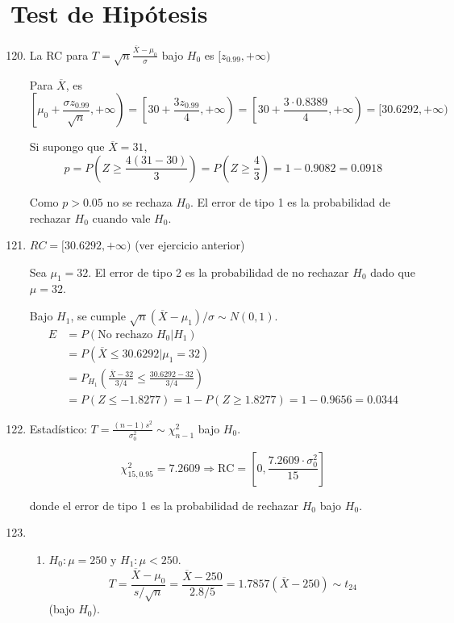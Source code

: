 \section{Test de Hipótesis}
\begin{enumerate}
	\setcounter{enumi}{119}
	\item
		La RC para $T = \sqrt{n}\frac{\overline{X}-\mu_0}{\sigma}$ bajo $H_0$ es $[z_{0.99},+\infty)$
		
		Para $\overline X$, es
		$$\left[\mu_0 + \frac{\sigma z_{0.99}}{\sqrt{n}}, +\infty\right) = \left[30 + \frac{3 z_{0.99}}{4}, +\infty\right) = \left[30 + \frac{3\cdot 0.8389}{4}, +\infty\right) = [30.6292, +\infty)$$
		
		Si supongo que $\overline{X} = 31$,
		$$p= P\left(Z \geq \frac{4(31-30)}{3}\right) = P\left(Z \geq \frac{4}{3}\right) = 1 - 0.9082 = 0.0918$$
		
		Como $p > 0.05$ no se rechaza $H_0$. El error de tipo 1 es la probabilidad de rechazar $H_0$ cuando vale $H_0$.
		
	\item
		$RC = [30.6292, +\infty)$ (ver ejercicio anterior)
		
		Sea $\mu_1 = 32$. El error de tipo 2 es la probabilidad de no rechazar $H_0$ dado que $\mu = 32$.
		
		Bajo $H_1$, se cumple $\sqrt{n}(\overline{X} - \mu_1) / \sigma \sim N(0,1)$.
		\begin{align*}
			E	& = P(\text{No rechazo }H_0|H_1)	\\
				& = P(\overline{X} \leq 30.6292| \mu_1 = 32)	\\
				& = P_{H_1}\left(\frac{\overline{X}-32}{3/4} \leq \frac{30.6292-32}{3/4}\right)	\\
				& = P(Z \leq -1.8277)	= 1 - P(Z \geq 1.8277) = 1 - 0.9656 = 0.0344
		\end{align*}
		
	\item
		Estadístico: $T = \frac{(n-1)s^2}{\sigma_0^2} \sim \chi_{n-1}^2$ bajo $H_0$.
		
		$$\chi_{15,0.95}^2 = 7.2609 \Rightarrow \text{RC} = \left[0, \frac{7.2609\cdot \sigma_0^2}{15}\right]$$
		
		donde el error de tipo 1 es la probabilidad de rechazar $H_0$ bajo $H_0$.
		
	\item
		\begin{enumerate}
			\item
				$H_0: \mu = 250$ y $H_1:  \mu < 250$.
				$$T = \frac{\overline{X}-\mu_0}{s/\sqrt{n}} = \frac{\overline{X}-250}{2.8/5} = 1.7857(\overline{X}-250) \sim t_{24}$$
				(bajo $H_0$).
				

\end{enumerate}
\end{enumerate}
